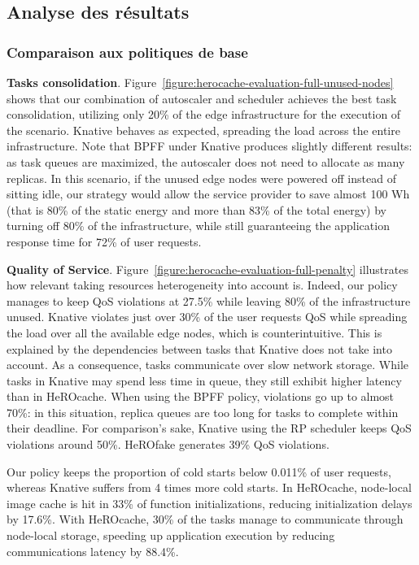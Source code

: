 \subsection{Analyse des résultats}

\subsubsection{Comparaison aux politiques de base}

\textbf{Tasks consolidation}. Figure~\ref{figure:herocache-evaluation-full-unused-nodes} shows that our combination of autoscaler and scheduler achieves the best task consolidation, utilizing only 20\% of the edge infrastructure for the execution of the scenario. Knative behaves as expected, spreading the load across the entire infrastructure. Note that BPFF under Knative produces slightly different results: as task queues are maximized, the autoscaler does not need to allocate as many replicas. In this scenario, if the unused edge nodes were powered off instead of sitting idle, our strategy would allow the service provider to save almost 100 Wh (that is 80\% of the static energy and more than 83\% of the total energy) by turning off 80\% of the infrastructure, while still guaranteeing the application response time for 72\% of user requests.

\textbf{Quality of Service}. Figure~\ref{figure:herocache-evaluation-full-penalty} illustrates how relevant taking resources heterogeneity into account is. Indeed, our policy manages to keep QoS violations at 27.5\% while leaving 80\% of the infrastructure unused. Knative violates just over 30\% of the user requests QoS while spreading the load over all the available edge nodes, which is counterintuitive. This is explained by the dependencies between tasks that Knative does not take into account. As a consequence, tasks communicate over slow network storage. While tasks in Knative may spend less time in queue, they still exhibit higher latency than in HeROcache. When using the BPFF policy, violations go up to almost 70\%: in this situation, replica queues are too long for tasks to complete within their deadline. For comparison's sake, Knative using the RP scheduler keeps QoS violations around 50\%. HeROfake generates 39\% QoS violations.

Our policy keeps the proportion of cold starts below 0.011\% of user requests, whereas Knative suffers from 4 times more cold starts. In HeROcache, node-local image cache is hit in 33\% of function initializations, reducing initialization delays by 17.6\%.
With HeROcache, 30\% of the tasks manage to communicate through node-local storage, speeding up application execution by reducing communications latency by 88.4\%.

